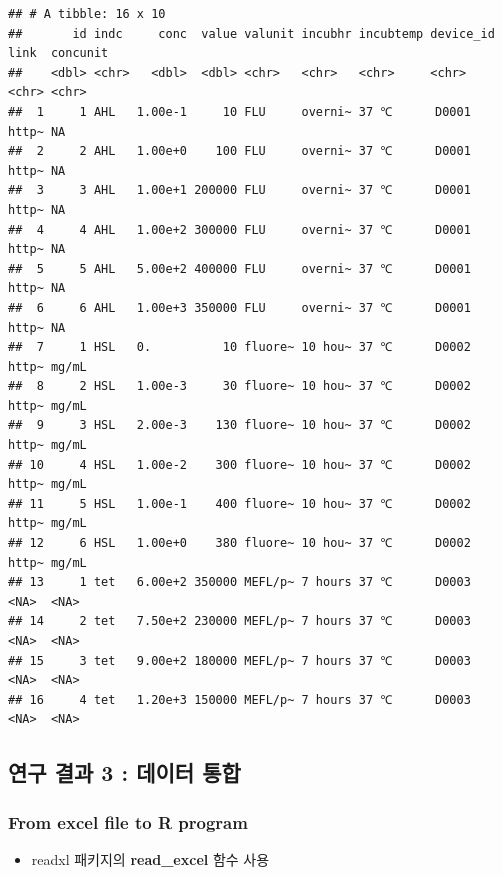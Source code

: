 \documentclass[
]{article}
\providecommand{\tightlist}{%
  \setlength{\itemsep}{0pt}\setlength{\parskip}{0pt}}
\begin{document}
\begin{verbatim}
## # A tibble: 16 x 10
##       id indc     conc  value valunit incubhr incubtemp device_id link  concunit
##    <dbl> <chr>   <dbl>  <dbl> <chr>   <chr>   <chr>     <chr>     <chr> <chr>   
##  1     1 AHL   1.00e-1     10 FLU     overni~ 37 ℃      D0001     http~ NA      
##  2     2 AHL   1.00e+0    100 FLU     overni~ 37 ℃      D0001     http~ NA      
##  3     3 AHL   1.00e+1 200000 FLU     overni~ 37 ℃      D0001     http~ NA      
##  4     4 AHL   1.00e+2 300000 FLU     overni~ 37 ℃      D0001     http~ NA      
##  5     5 AHL   5.00e+2 400000 FLU     overni~ 37 ℃      D0001     http~ NA      
##  6     6 AHL   1.00e+3 350000 FLU     overni~ 37 ℃      D0001     http~ NA      
##  7     1 HSL   0.          10 fluore~ 10 hou~ 37 ℃      D0002     http~ mg/mL   
##  8     2 HSL   1.00e-3     30 fluore~ 10 hou~ 37 ℃      D0002     http~ mg/mL   
##  9     3 HSL   2.00e-3    130 fluore~ 10 hou~ 37 ℃      D0002     http~ mg/mL   
## 10     4 HSL   1.00e-2    300 fluore~ 10 hou~ 37 ℃      D0002     http~ mg/mL   
## 11     5 HSL   1.00e-1    400 fluore~ 10 hou~ 37 ℃      D0002     http~ mg/mL   
## 12     6 HSL   1.00e+0    380 fluore~ 10 hou~ 37 ℃      D0002     http~ mg/mL   
## 13     1 tet   6.00e+2 350000 MEFL/p~ 7 hours 37 ℃      D0003     <NA>  <NA>    
## 14     2 tet   7.50e+2 230000 MEFL/p~ 7 hours 37 ℃      D0003     <NA>  <NA>    
## 15     3 tet   9.00e+2 180000 MEFL/p~ 7 hours 37 ℃      D0003     <NA>  <NA>    
## 16     4 tet   1.20e+3 150000 MEFL/p~ 7 hours 37 ℃      D0003     <NA>  <NA>
\end{verbatim}

\hypertarget{uxc5f0uxad6c-uxacb0uxacfc-3-uxb370uxc774uxd130-uxd1b5uxd569}{%
\subsection{연구 결과 3 : 데이터
통합}\label{uxc5f0uxad6c-uxacb0uxacfc-3-uxb370uxc774uxd130-uxd1b5uxd569}}

\hypertarget{from-excel-file-to-r-program}{%
\subsubsection{From excel file to R
program}\label{from-excel-file-to-r-program}}

\begin{itemize}
\tightlist
\item
  readxl 패키지의 \textbf{read\_excel} 함수 사용
\end{itemize}
\end{document}
